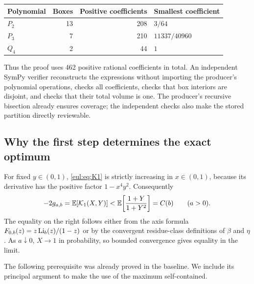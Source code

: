 \begin{center}
\begin{tabular}{@{}lrrl@{}}
\toprule
Polynomial & Boxes & Positive coefficients & Smallest coefficient\\
\midrule
$P_2$ & 13 & 208 & $3/64$\\
$P_3$ & 7 & 210 & $11337/40960$\\
$Q_4$ & 2 & 44 & $1$\\
\bottomrule
\end{tabular}
\end{center}

Thus the proof uses 462 positive rational coefficients in total.
An independent SymPy verifier reconstructs the expressions without
importing the producer's polynomial operations, checks all coefficients,
checks that box interiors are disjoint, and checks that their total
volume is one. The producer's recursive bisection already ensures
coverage; the independent checks also make the stored partition
directly reviewable.

\subsection{Why the first step determines the exact optimum}

For fixed $y\in(0,1)$, \eqref{eul:eq:K1} is strictly increasing in
$x\in(0,1)$, because its derivative has the positive factor
$1-x^4y^2$. Consequently
\begin{equation}\label{eul:eq:axis-domination}
 -2g_{a,b}=\mathbb E[\mathcal K_1(X,Y)]
 <\mathbb E\!\left[\frac{1+Y}{1+Y^2}\right]=C(b)
 \qquad(a>0).
\end{equation}
The equality on the right follows either from the axis formula
$F_{0,b}(z)=z\operatorname{Li}_b(z)/(1-z)$ or by the convergent residue-class
definitions of $\beta$ and $\eta$. As $a\downarrow0$, $X\to1$
in probability, so bounded convergence gives equality in the limit.

The following prerequisite was already proved in the baseline. We
include its principal argument to make the use of the maximum
self-contained.

